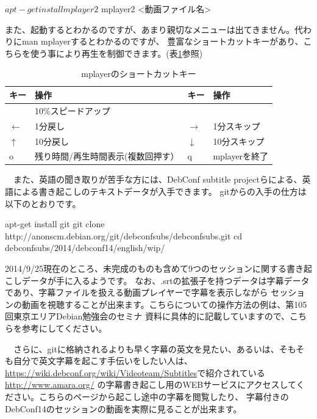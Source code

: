 \documentclass[mingoth,a4paper]{jsarticle}
\begin{document}
\begin{commandline}
$ apt-get install mplayer2
$ mplayer2 <動画ファイル名>
\end{commandline} 

 また、起動するとわかるのですが、あまり親切なメニューは出てきません。代わりにman mplayerするとわかるのですが、
豊富なショートカットキーがあり、こちらを使う事により再生を制御できます。(表\ref{tab:mplayer-key}参照)


\begin{table}[ht]
\begin{center}
\begin{tabular}{|l|p{7cm}|l|p{7cm}|}
\hline 
キー&操作 &キー & 操作\\ \hline \hline
[ & 10\%スロー & ] & 10\%スピードアップ \\ \hline 
$\leftarrow$ & 1分戻し & $\rightarrow$ & 1分スキップ \\ \hline
$\uparrow$ & 10分戻し & $\downarrow$ & 10分スキップ \\ \hline
o & 残り時間/再生時間表示(複数回押す） & q & mplayerを終了\\ \hline
\end{tabular}
\end{center}
\caption{mplayerのショートカットキー}
\label{tab:mplayer-key}
\end{table}

　また、英語の聞き取りが苦手な方には、DebConf subtitle projectらによる、英語による書き起こしのテキストデータが入手できます。
gitからの入手の仕方は以下のとおりです。

\begin{commandline}
apt-get install git
git clone http://anonscm.debian.org/git/debconfsubs/debconfsubs.git
cd debconfsubs/2014/debconf14/english/wip/
\end{commandline}
 
 2014/9/25現在のところ、未完成のものも含めて9つのセッションに関する書き起こしデータが手に入るようです。
なお、.srtの拡張子を持つデータは字幕データであり、字幕ファイルを扱える動画プレイヤーで字幕を表示しながら
セッションの動画を視聴することが出来ます。こちらについての操作方法の例は、第105回東京エリアDebian勉強会のセミナ
資料\cite{ref:osc-tokyo-2013-fall}に具体的に記載していますので、こちらを参考にしてください。

　さらに、gitに格納されるよりも早く字幕の英文を見たい、あるいは、そもそも自分で英文字幕を起こす手伝いをしたい人は、
\url{https://wiki.debconf.org/wiki/Videoteam/Subtitles}で紹介されている\url{http://www.amara.org/}
の字幕書き起こし用のWEBサービスにアクセスしてください。こちらのページから起こし途中の字幕を閲覧したり、
字幕付きのDebConf14のセッションの動画を実際に見ることが出来ます。
\end{document}
